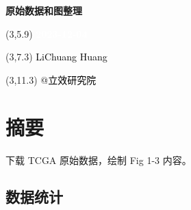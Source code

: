 \documentclass[
]{article}
\author{}
\date{\vspace{-2.5em}}
\begin{document}
\begin{titlepage} 
\begin{center} \textbf{\Huge 原始数据和图整理}
\vspace{4em} \begin{textblock}{10}(3,5.9) \huge
\textbf{\textcolor{white}{2023-12-04}}
\end{textblock} \begin{textblock}{10}(3,7.3)
\Large \textcolor{black}{LiChuang Huang}
\end{textblock} \begin{textblock}{10}(3,11.3)
\Large \textcolor{black}{@立效研究院}
\end{textblock} \end{center} \end{titlepage}
\restoregeometry


\tableofcontents

\listoffigures

\listoftables

\newpage


\hypertarget{abstract}{%
\section{摘要}\label{abstract}}

下载 TCGA 原始数据，绘制 Fig 1-3 内容。

\hypertarget{ux6570ux636eux7edfux8ba1}{%
\subsection{数据统计}\label{ux6570ux636eux7edfux8ba1}}
\end{document}
